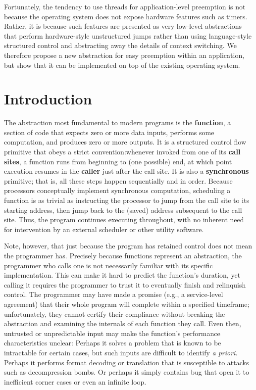 \documentclass[12pt,letterpaper,openright]{report}
\begin{document}
Fortunately, the tendency to use threads for application-level preemption is not
because the operating system does not expose hardware features such as timers.
Rather, it is because such features are presented as very low-level abstractions that
perform hardware-style unstructured jumps rather than using language-style structured
control and abstracting away the details of context switching.  We therefore propose
a new abstraction for easy preemption within an application, but show that it can be
implemented on top of the existing operating system.


\chapter{Introduction}

The abstraction most fundamental to modern programs is the \textbf{function}, a
section of code that expects zero or more data inputs, performs some computation, and
produces zero or more outputs.  It is a structured control flow primitive that obeys
a strict convention:\@ whenever invoked from one of its \textbf{call sites}, a
function runs from beginning to (one possible) end, at which point execution resumes
in the \textbf{caller} just after the call site.  It is also a \textbf{synchronous}
primitive; that is, all these steps happen sequentially and in order.  Because
processors conceptually implement synchronous computation, scheduling a function is
as trivial as instructing the processor to jump from the call site to its starting
address, then jump back to the (saved) address subsequent to the call site.  Thus,
the program continues executing throughout, with no inherent need for intervention by
an external scheduler or other utility software.

Note, however, that just because the program has retained control does not mean the
programmer has.  Precisely because functions represent an abstraction, the programmer
who calls one is not necessarily familiar with its specific implementation.  This can
make it hard to predict the function's duration, yet calling it requires the
programmer to trust it to eventually finish and relinquish control.  The programmer
may have made a promise (e.g., a service-level agreement) that their whole program
will complete within a specified timeframe; unfortunately, they cannot certify their
compliance without breaking the abstraction and examining the internals of each
function they call.  Even then, untrusted or unpredictable input may make the
function's performance characteristics unclear:  Perhaps it solves a problem that is
known to be intractable for certain cases, but such inputs are difficult to identify
\textit{a priori}.  Perhaps it performs format decoding or translation that is
susceptible to attacks such as decompression bombs.  Or perhaps it simply contains
bug that open it to inefficient corner cases or even an infinite loop.
\end{document}
